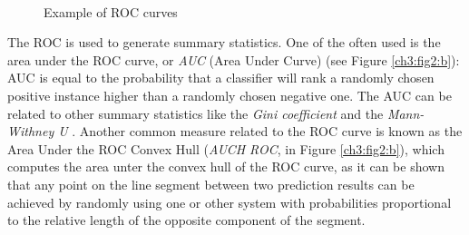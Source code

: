\begin{figure}[!hbt]
  \centering
    \\
    \caption{Example of ROC curves}
    \label{ch3:fig2}
\end{figure}


The \Gls{ROC} is used to generate summary statistics. One of the often used is the area under the \Gls{ROC} curve, or \textit{AUC} (Area Under Curve)\cite{Brown200624, ROC02} (see Figure \ref{ch3:fig2:b}):
AUC is equal to the probability that a classifier will rank a randomly chosen positive instance higher than a randomly chosen negative one. The AUC can be related to other
summary statistics like the \textit{Gini coefficient} \cite{Gini} and the \textit{Mann-Withney U} \cite{MWU}.
Another common measure related to the \Gls{ROC} curve is known as the Area Under the ROC Convex Hull (\textit{AUCH ROC}, in Figure \ref{ch3:fig2:b}), which computes the area unter the convex hull of the ROC curve, as
it can be shown that any point on the line segment between two prediction results can be achieved by randomly using one or other system with probabilities proportional to the relative length of the opposite component of the segment.

